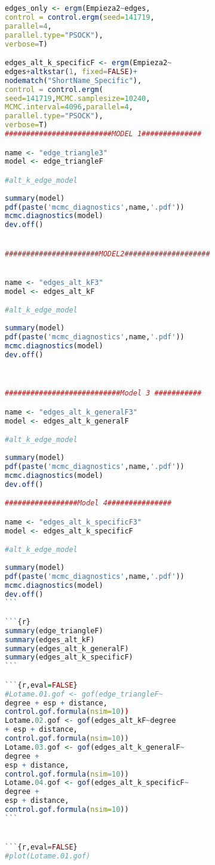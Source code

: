 \begin{lstlisting}[language=R]
edges_only <- ergm(Empieza2~edges,
control = control.ergm(seed=141719,
parallel=4,
parallel.type="PSOCK"),
verbose=T)

edges_alt_k_specificF <- ergm(Empieza2~
edges+altkstar(1, fixed=FALSE)+
nodematch("ShortName_Specific"),
control = control.ergm(
seed=141719,MCMC.samplesize=10240,
MCMC.interval=4096,parallel=4,
parallel.type="PSOCK"),
verbose=T)
#########################MODEL 1##############

name <- "edge_triangle3"
model <- edge_triangleF

#alt_k_edge_model
  
summary(model)
pdf(paste('mcmc_diagnostics',name,'.pdf'))
mcmc.diagnostics(model)
dev.off() 


######################MODEL2####################


name <- "edges_alt_kF3"
model <- edges_alt_kF

#alt_k_edge_model
  
summary(model)
pdf(paste('mcmc_diagnostics',name,'.pdf'))
mcmc.diagnostics(model)
dev.off() 



###########################Model 3 ###########

name <- "edges_alt_k_generalF3"
model <- edges_alt_k_generalF

#alt_k_edge_model
  
summary(model)
pdf(paste('mcmc_diagnostics',name,'.pdf'))
mcmc.diagnostics(model)
dev.off()

#################Model 4###############

name <- "edges_alt_k_specificF3"
model <- edges_alt_k_specificF

#alt_k_edge_model
  
summary(model)
pdf(paste('mcmc_diagnostics',name,'.pdf'))
mcmc.diagnostics(model)
dev.off()
```

```{r}
summary(edge_triangleF)
summary(edges_alt_kF)
summary(edges_alt_k_generalF)
summary(edges_alt_k_specificF)
```

```{r,eval=FALSE}
#Lotame.01.gof <- gof(edge_triangleF~
degree + esp + distance, 
control.gof.formula(nsim=10))
Lotame.02.gof <- gof(edges_alt_kF~degree 
+ esp + distance, 
control.gof.formula(nsim=10))
Lotame.03.gof <- gof(edges_alt_k_generalF~
degree + 
esp + distance, 
control.gof.formula(nsim=10))
Lotame.04.gof <- gof(edges_alt_k_specificF~
degree + 
esp + distance, 
control.gof.formula(nsim=10))
```


```{r,eval=FALSE}
#plot(Lotame.01.gof)


\end{lstlisting}
